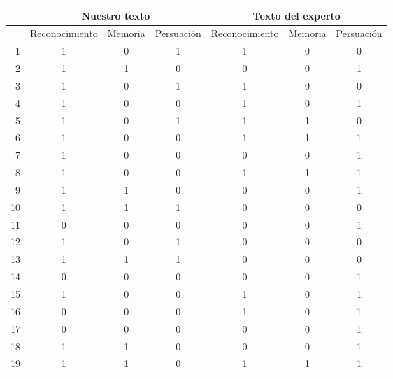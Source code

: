 \begin{table}
\centering
\tiny
\begin{tabular}{|r|c|c|c|c|c|c|}
   & \multicolumn{3}{c|}{Nuestro texto}     & \multicolumn{3}{c|}{Texto del experto}   \\\hline
   & Reconocimiento & Memoria & Persuación & Reconocimiento & Memoria & Persuación \\\hline \hline

1 &         1 &         0 &         1 &         1 &         0 &         0 \\
2 &         1 &         1 &         0 &         0 &         0 &         1 \\
3 &         1 &         0 &         1 &         1 &         0 &         0 \\
4 &         1 &         0 &         0 &         1 &         0 &         1 \\
5 &         1 &         0 &         1 &         1 &         1 &         0 \\
6 &         1 &         0 &         0 &         1 &         1 &         1 \\
7 &         1 &         0 &         0 &         0 &         0 &         1 \\
8 &         1 &         0 &         0 &         1 &         1 &         1 \\
9 &         1 &         1 &         0 &         0 &         0 &         1 \\
10 &         1 &         1 &         1 &         0 &         0 &         0 \\
11 &         0 &         0 &         0 &         0 &         0 &         1 \\
12 &         1 &         0 &         1 &         0 &         0 &         0 \\
13 &         1 &         1 &         1 &         0 &         0 &         0 \\
14 &         0 &         0 &         0 &         0 &         0 &         1 \\
15 &         1 &         0 &         0 &         1 &         0 &         1 \\
16 &         0 &         0 &         0 &         1 &         0 &         1 \\
17 &         0 &         0 &         0 &         0 &         0 &         1 \\
18 &         1 &         1 &         0 &         0 &         0 &         1 \\
19 &         1 &         1 &         0 &         1 &         1 &         1 \\

\end{tabular}
\end{table}
